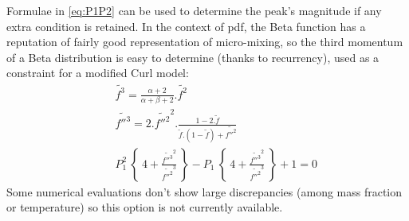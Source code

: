 Formulae in \eqref{eq:P1P2} can be used to determine the peak's magnitude if any
extra condition is retained. In the context of pdf, the Beta function has a reputation of fairly good representation of micro-mixing, so the third momentum of a
Beta distribution is easy to determine (thanks to recurrency), used as a
constraint for a modified Curl model:
\begin{eqnarray}
&&\widetilde{f^3}     = \frac{\alpha +2}{\alpha+\beta+2} .\widetilde{f^2}  \label{Eqs_xx7}\\
&&\widetilde{f{''}^3} =2 . \widetilde{f{''}^2}^2 . \frac{1-2.\tilde{f}}{\tilde{f}.(1-\tilde{f})+\widetilde{f{''}^2}}  \label{Eqs_xx8}\\
&&P_1^2~\left\{~          4+\frac{\widetilde{f{''}^3}^2}{\widetilde{f{''}^2}^3}~\right\}
                 -P_1~\left\{~ 4+\frac{\widetilde{f{''}^3}^2}{\widetilde{f{''}^2}^3}~\right\}+1=0 \label{Eqs_xx9}
\end{eqnarray}
Some numerical evaluations don't show large discrepancies ({\small among mass fraction or temperature}) so this option is not currently available.

\newpage

